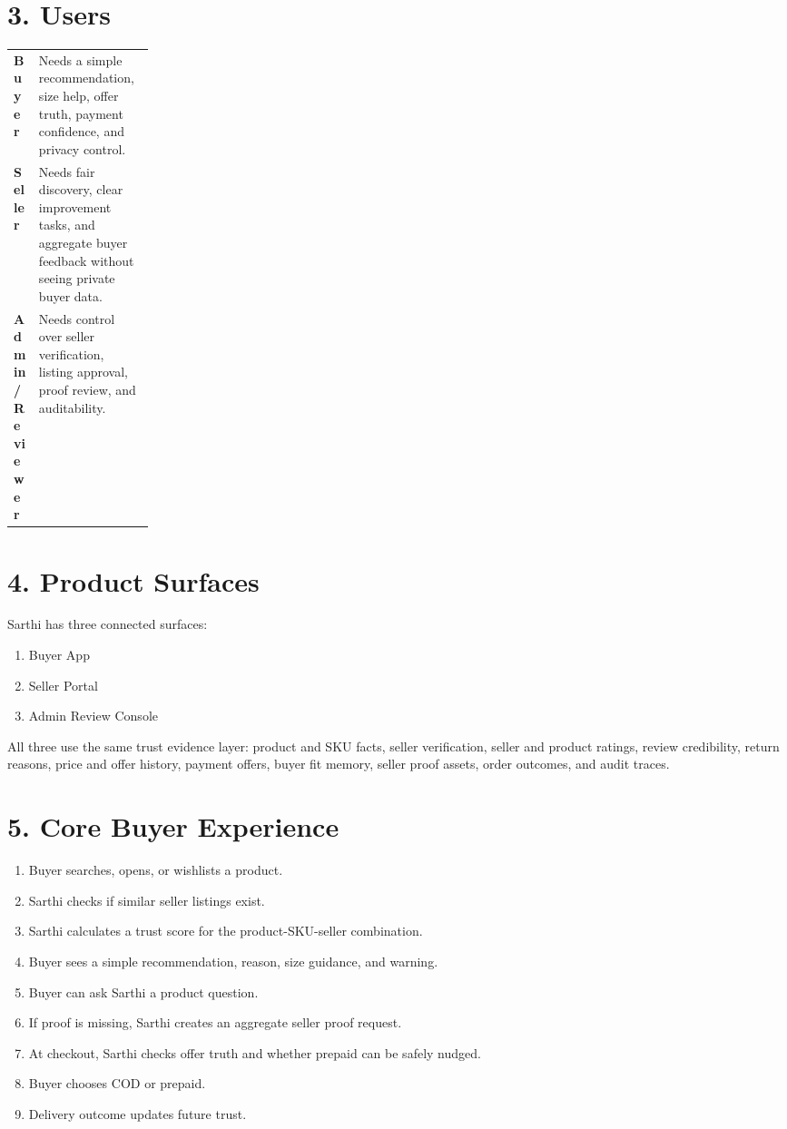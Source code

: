 \documentclass[11pt,a4paper,landscape]{article}
\begin{document}
\section{3. Users}
\begin{tabularx}{\linewidth}{>{\bfseries}p{0.18\linewidth}X}
\toprule
Buyer & Needs a simple recommendation, size help, offer truth, payment confidence, and privacy control.\\
Seller & Needs fair discovery, clear improvement tasks, and aggregate buyer feedback without seeing private buyer data.\\
Admin / Reviewer & Needs control over seller verification, listing approval, proof review, and auditability.\\
\bottomrule
\end{tabularx}

\section{4. Product Surfaces}
Sarthi has three connected surfaces:
\begin{enumerate}
  \item Buyer App
  \item Seller Portal
  \item Admin Review Console
\end{enumerate}

All three use the same trust evidence layer: product and SKU facts, seller verification, seller and product ratings, review credibility, return reasons, price and offer history, payment offers, buyer fit memory, seller proof assets, order outcomes, and audit traces.

\section{5. Core Buyer Experience}
\begin{enumerate}
  \item Buyer searches, opens, or wishlists a product.
  \item Sarthi checks if similar seller listings exist.
  \item Sarthi calculates a trust score for the product-SKU-seller combination.
  \item Buyer sees a simple recommendation, reason, size guidance, and warning.
  \item Buyer can ask Sarthi a product question.
  \item If proof is missing, Sarthi creates an aggregate seller proof request.
  \item At checkout, Sarthi checks offer truth and whether prepaid can be safely nudged.
  \item Buyer chooses COD or prepaid.
  \item Delivery outcome updates future trust.
\end{enumerate}
\end{document}
